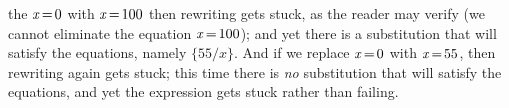 \documentclass[acmsmall]{acmart}
\newcommand{\Varid}[1]{\mathit{#1}}
\begin{document}
the \ensuremath{\Varid{x}\hspace{-0.14em}=\hspace{-0.14em}\mathrm{0}} with \ensuremath{\Varid{x}\hspace{-0.14em}=\hspace{-0.14em}\mathrm{100}} then rewriting gets stuck, as the reader may verify
(we cannot eliminate the equation \ensuremath{\Varid{x}\hspace{-0.14em}=\hspace{-0.14em}\mathrm{100}}); and yet there
is a substitution that will satisfy the equations, namely $\{55/x\}$.
And if we replace \ensuremath{\Varid{x}\hspace{-0.14em}=\hspace{-0.14em}\mathrm{0}} with \ensuremath{\Varid{x}\hspace{-0.14em}=\hspace{-0.14em}\mathrm{55}}, then rewriting again
gets stuck; this time there is \emph{no} substitution that will satisfy the equations, and yet
the expression gets stuck rather than failing.

\end{document}
